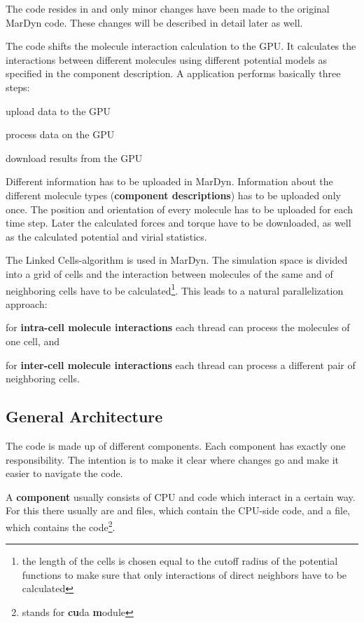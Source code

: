 The code resides in  and only minor changes have been made to the original MarDyn code. These changes will be described in detail later as well.

The \cuda{} code shifts the molecule interaction calculation to the GPU. It calculates the interactions between different molecules using different potential models as specified in the component description.
A \cuda{} application performs basically three steps:
\begin{compactenum}
\item upload data to the GPU
\item process data on the GPU
\item download results from the GPU
\end{compactenum} 
Different information has to be uploaded in MarDyn. Information about the different molecule types (\textbf{component descriptions}) has to be uploaded only once. The position and orientation of every molecule has to be uploaded for each time step. 
Later the calculated forces and torque have to be downloaded, as well as the calculated potential and virial statistics.

The Linked Cells-algorithm is used in MarDyn. The simulation space is divided into a grid of cells and the interaction between molecules of the same and of neighboring cells have to be calculated\footnote{the length of the cells is chosen equal to the cutoff radius of the potential functions to make sure that only interactions of direct neighbors have to be calculated}.
This leads to a natural parallelization approach:
\begin{compactitem}
\item for \textbf{intra-cell molecule interactions} each thread can process the molecules of one cell, and
\item for \textbf{inter-cell molecule interactions} each thread can process a different pair of neighboring cells.
\end{compactitem}

\subsection{General Architecture}
The \cuda{} code is made up of different components. Each component has exactly one responsibility.
The intention is to make it clear where changes go and make it easier to navigate the code.

A \textbf{component} usually consists of CPU and \cuda{} code which interact in a certain way. For this there usually are  and  files, which contain the CPU-side code, and a  file, which contains the \cuda{} code\footnote{ stands for \textbf{cu}da \textbf{m}odule}.

